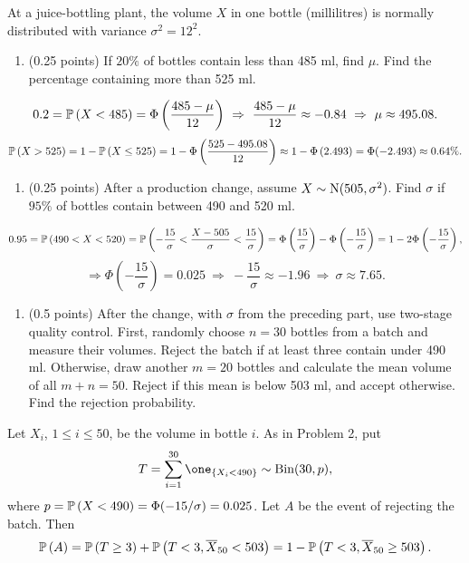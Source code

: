 \documentclass[a4paper]{report}
\begin{document}
\begin{problem}
At a juice-bottling plant, the volume $X$ in one bottle (millilitres) is normally distributed with variance $\sigma^2=12^2$.
\begin{enumerate}
    \item (0.25 points) If $20\%$ of bottles contain less than 485 ml, find $\mu$. Find the percentage containing more than 525 ml.
\end{enumerate}
$$0.2 = \mathbb P\left( X<485\right) = \Phi\left(\frac{485-\mu}{12}\right)~\Rightarrow~\frac{485-\mu}{12}\approx-0.84~\Rightarrow~\mu\approx495.08.$$
$$\mathbb P\left( X>525\right) = 1-\mathbb P\left( X\leq525\right) = 1-\Phi\left(\frac{525-495.08}{12}\right)\approx1-\Phi\left(2.493\right)=\Phi(-2.493)\approx 0.64\%.$$
\begin{enumerate}[resume]
    \item (0.25 points) After a production change, assume $X\sim\mbox N(505,\sigma^2)$. Find $\sigma$ if $95\%$ of bottles contain between 490 and 520 ml.
\end{enumerate}
$$0.95=\mathbb P\left( 490<X<520\right) = \mathbb P\left( -\frac{15}{\sigma}<\frac{X-505}{\sigma}<\frac{15}{\sigma}\right) = \Phi\left(\frac{15}{\sigma}\right)-\Phi\left(-\frac{15}{\sigma}\right) = 1-2\Phi\left(-\frac{15}{\sigma}\right),$$
$$\Rightarrow \Phi\left(-\frac{15}{\sigma}\right)=0.025~\Rightarrow~-\frac{15}{\sigma}\approx-1.96~\Rightarrow~\sigma\approx 7.65.$$
\begin{enumerate}[resume]
    \item (0.5 points) After the change, with $\sigma$ from the preceding part, use two-stage quality control. First, randomly choose $n=30$ bottles from a batch and measure their volumes. Reject the batch if at least three contain under 490 ml. Otherwise, draw another $m=20$ bottles and calculate the mean volume of all $m+n=50$. Reject if this mean is below 503 ml, and accept otherwise. Find the rejection probability.
\end{enumerate}
Let $X_i$, $1\leq i\leq50$, be the volume in bottle $i$. As in Problem 2, put $$T=\sum_{i=1}^{30}\one_{\{X_i<490\}}\sim\mbox{Bin}(30,p),$$ where $p=\mathbb P\left( X<490\right)=\Phi(-15/\sigma)=0.025$. Let $A$ be the event of rejecting the batch. Then $$\mathbb P\left( A\right)=\mathbb P\left( T\geq3\right)+\mathbb P\left( T<3,\overline X_{50}<503\right)=1-\mathbb P\left( T<3,\overline X_{50}\geq503\right).$$
\end{problem}
\end{document}
